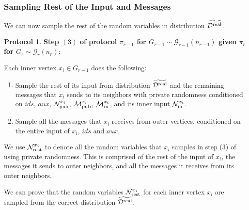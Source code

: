 \documentclass[11pt]{article}
\theoremstyle{definition}
\newtheorem{mdprotocol}{Protocol}
\newenvironment{Protocol}{\begin{tbox}\begin{mdprotocol}}{\end{mdprotocol}\end{tbox}}
\newenvironment{tbox}{\begin{tcolorbox}[
		enlarge top by=5pt,
		enlarge bottom by=5pt,
		 breakable,
		 boxsep=0pt,
                  left=4pt,
                  right=4pt,
                  top=10pt,
                  arc=4pt,
                  boxrule=1pt,toprule=1pt,
                  colback=white
                  ]%
	}
{\end{tcolorbox}}
\newcounter{mybox}
\renewcommand{\themybox}{\arabic{mybox}}
\newcommand{\namethebox}{\begin{center}\textbf{Box~\themybox} \end{center}}
\newcommand{\prot}{\ensuremath{\pi}}
\newcommand{\Ninner}[2]{\ensuremath{\mathcal{N}_{\textnormal{in}}^{#1_{#2}}}}
\newcommand{\cD}{\ensuremath{\mathcal{D}}}
\newcommand{\cG}{\ensuremath{\mathcal{G}}}
\newcommand{\cDreal}{\ensuremath{\cD^{\textnormal{real}}}}
\newcommand{\cDrealtil}{\ensuremath{\widetilde{\cDreal}}}
\newcommand{\ids}{\ensuremath{ids}}
\newcommand{\aux}{\ensuremath{aux}}
\newcommand{\Npub}[1]{\ensuremath{\mathcal{N}_{\textnormal{pub}}^{#1}}}
\newcommand{\Mpub}[1]{\ensuremath{\mathcal{M}_{\textnormal{pub}}^{#1}}}
\newcommand{\Minner}[1]{\ensuremath{\mathcal{M}_{\textnormal{in}}^{#1}}}
\newcommand{\Nrest}[1]{\ensuremath{\mathcal{N}^{#1}_{\textnormal{rest}}}}
\begin{document}
\subsubsection{Sampling Rest of the Input and Messages}

We can now sample the rest of the random variables in distribution $\cDrealtil$.

\begin{Protocol}\label{box:r-1-step3-input-rest}
			\textbf{Step $\bm{(3)}$ of protocol $\prot_{r-1}$ for $G_{r-1} \sim \cG_{r-1}(n_{r-1})$ given $\prot_{r}$ for $G_{r} \sim \cG_r(n_r)$}:
	\vspace{2mm}

Each inner vertex $x_i \in G_{r-1}$ does the following:
		\begin{enumerate}[label=(\alph*)]
			\item Sample the rest of its input from distribution $\cDrealtil$ and the remaining messages that $x_i$ sends to its neighbors with private randomness conditioned on $\ids$, $\aux$, $\Npub{x_i}$, $\Mpub{x_i}$, $\Minner{x_i}$, and its inner input $\Ninner{x}{i}$. 
	
			\item Sample all the messages that $x_i$ receives from outer vertices, conditioned on the entire input of $x_i$, $\ids$ and $\aux$.
		\end{enumerate}
		
		We use $\Nrest{x_i}$ to denote all the random variables that $x_i$ samples in step (3) of   using private randomness. This is comprised of the rest of the input of $x_i$, the messages it sends to outer neighbors, and all the messages it receives from its outer neighbors. 
\end{Protocol}

We can prove that the random variables $\Nrest{x_i}$ for each inner vertex $x_i$  are sampled from the correct distribution $\cDrealtil$.
\end{document}

